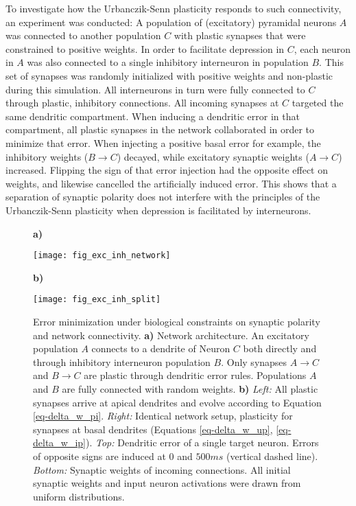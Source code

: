 To investigate how the Urbanczik-Senn plasticity responds to such connectivity, an experiment was conducted: A
population of (excitatory) pyramidal neurons \textbf{$A$}  was connected to another population \textbf{$C$} with plastic
synapses that were constrained to positive weights. In order to facilitate depression in \textbf{$C$}, each neuron in
\textbf{$A$} was also connected to a single inhibitory interneuron in population \textbf{$B$}. This set of synapses was
randomly initialized with positive weights and non-plastic during this simulation. All interneurons in turn were fully
connected to \textbf{$C$} through plastic, inhibitory connections. All incoming synapses at \textbf{$C$} targeted the
same dendritic compartment. When inducing a dendritic error in that compartment, all plastic synapses in the network
collaborated in order to minimize that error. When injecting a positive basal error for example, the inhibitory weights
($B \rightarrow C$) decayed, while excitatory synaptic weights ($A \rightarrow C$) increased. Flipping the sign of that
error injection had the opposite effect on weights, and likewise cancelled the artificially induced error. This shows
that a separation of synaptic polarity does not interfere with the principles of the Urbanczik-Senn plasticity when
depression is facilitated by interneurons.

\begin{figure}[h]
    \centering
    \begin{minipage}{0.2\textwidth}
        \textbf{a)}\par\medskip
        \centering
        \texttt{[image: fig\_exc\_inh\_network]}
    \end{minipage}\hfill
    \begin{minipage}{0.7\textwidth}
        \textbf{b)}\par\medskip
        \centering
        \texttt{[image: fig\_exc\_inh\_split]}
    \end{minipage}
    \caption[Error minimization under biological constraints on synaptic polarity and network connectivity]{Error
        minimization under biological constraints on synaptic polarity and network connectivity. \textbf{a)} Network
        architecture. An excitatory population $A$ connects to a dendrite of Neuron $C$ both directly and through
        inhibitory interneuron population $B$. Only synapses $A\rightarrow C$ and $B \rightarrow C$ are plastic through
        dendritic error rules. Populations $A$ and $B$ are fully connected with random weights. \textbf{b)}
        \textit{Left:} All plastic synapses arrive at apical dendrites and evolve according to Equation
        \ref{eq-delta_w_pi}. \textit{Right:} Identical network setup, plasticity for synapses at basal dendrites
        (Equations \ref{eq-delta_w_up}, \ref{eq-delta_w_ip}). \textit{Top:} Dendritic error of a single target neuron.
        Errors of opposite signs are induced at $0$ and $500ms$ (vertical dashed line). \textit{Bottom:} Synaptic
        weights of incoming connections. All initial synaptic weights and input neuron activations were drawn from
        uniform distributions.}
    \label{fig-exc-inh-split}
\end{figure}

